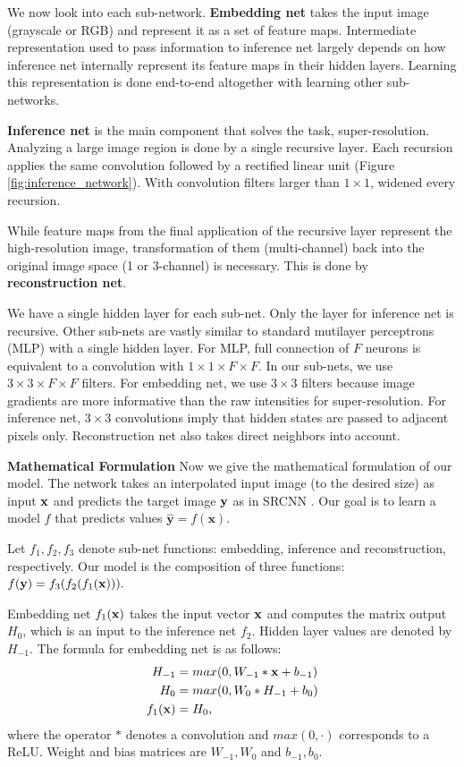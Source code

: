 \documentclass[10pt,twocolumn,letterpaper]{article}
\begin{document}
We now look into each sub-network. \textbf{Embedding net} takes the input image (grayscale or RGB) and represent it as a set of feature maps. Intermediate representation used to pass information to inference net largely depends on how inference net internally represent its feature maps in their hidden layers. Learning this representation is done end-to-end altogether with learning other sub-networks.


\textbf{Inference net} is the main component that solves the task, super-resolution. Analyzing a large image region is done by a single recursive layer. Each recursion applies the same convolution followed by a rectified linear unit (Figure \ref{fig:inference_network}). With convolution filters larger than $1\times 1$,  widened every recursion.   

While feature maps from the final application of the recursive layer represent the high-resolution image, transformation of them (multi-channel) back into the original image space (1 or 3-channel) is necessary. This is done by \textbf{reconstruction net}.  

We have a single hidden layer for each sub-net. Only the layer for inference net is recursive. Other sub-nets are vastly similar to standard mutilayer perceptrons (MLP) with a single hidden layer. For MLP, full connection of $F$ neurons is equivalent to a convolution with $1\times 1\times F \times F$. In our sub-nets, we use $3\times 3\times F \times F$ filters. For embedding net, we use $3\times 3$ filters because image gradients are more informative than the raw intensities for super-resolution. For inference net, $3\times 3$ convolutions imply that hidden states are passed to adjacent pixels only. Reconstruction net also takes direct neighbors into account.

\textbf{Mathematical Formulation} Now we give the mathematical formulation of our model. The network takes an interpolated input image (to the desired size) as input ${\bf x}$ and predicts the target image ${\bf y}$ as in SRCNN \cite{dong2014image}. Our goal is to learn a model $f$ that predicts values $\mathbf{\hat{y}}=f(\mathbf{x})$.  

 Let $f_1, f_2, f_3$ denote sub-net functions: embedding, inference and reconstruction, respectively. Our model is the composition of three functions: $f({\bf y}) = f_3(f_2 (f_1({\bf x}))).$
 
 Embedding net $f_1({\bf x})$ takes the input vector ${\bf x}$ and computes the matrix output $H_0$, which is an input to the inference net $f_2$. Hidden layer values are denoted by $H_{-1}$. The formula for embedding net is as follows:
  \begin{align}
        H_{-1} &= max(0, W_{-1}*{\bf x} + b_{-1})\\
        H_0 &= max(0, W_{0}*H_{-1} + b_0)\\
        f_1({\bf x}) &= H_0,
    \end{align}
where the operator $*$ denotes a convolution and $max(0,\cdot)$ corresponds to a ReLU. Weight and bias matrices are $W_{-1},W_0$ and $b_{-1},b_0$.
\end{document}
